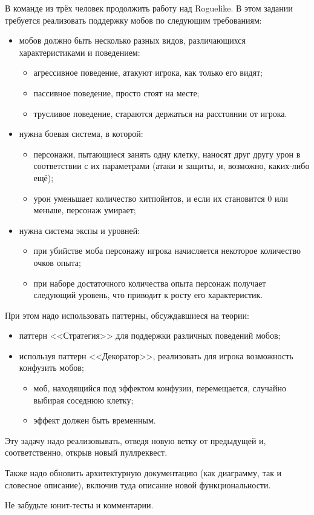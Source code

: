 \documentclass[a5paper]{homework}
\begin{document}

В команде из трёх человек продолжить работу над Roguelike. В этом задании требуется реализовать поддержку мобов по следующим требованиям:

\begin{itemize}
    \item мобов должно быть несколько разных видов, различающихся характеристиками и поведением:
    \begin{itemize}
        \item агрессивное поведение, атакуют игрока, как только его видят;
        \item пассивное поведение, просто стоят на месте;
        \item трусливое поведение, стараются держаться на расстоянии от игрока.
    \end{itemize}
    \item нужна боевая система, в которой:
    \begin{itemize}
        \item персонажи, пытающиеся занять одну клетку, наносят друг другу урон в соответствии с их параметрами (атаки и защиты, и, возможно, каких-либо ещё);
        \item урон уменьшает количество хитпойнтов, и если их становится 0 или меньше, персонаж умирает;
    \end{itemize} 
    \item нужна система экспы и уровней:
    \begin{itemize}
        \item при убийстве моба персонажу игрока начисляется некоторое количество очков опыта;
        \item при наборе достаточного количества опыта персонаж получает следующий уровень, что приводит к росту его характеристик.
    \end{itemize}
\end{itemize}

При этом надо использовать паттерны, обсуждавшиеся на теории:

\begin{itemize}
    \item паттерн <<Стратегия>> для поддержки различных поведений мобов;
    \item используя паттерн <<Декоратор>>, реализовать для игрока возможность конфузить мобов;
    \begin{itemize}
        \item моб, находящийся под эффектом конфузии, перемещается, случайно выбирая соседнюю клетку;
        \item эффект должен быть временным.
    \end{itemize}
\end{itemize}

Эту задачу надо реализовывать, отведя новую ветку от предыдущей и, соответственно, открыв новый пуллреквест. 

Также надо обновить архитектурную документацию (как диаграмму, так и словесное описание), включив туда описание новой функциональности.

Не забудьте юнит-тесты и комментарии.
\end{document}
